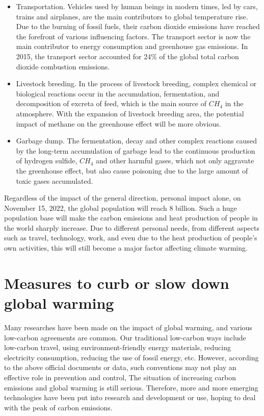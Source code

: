\documentclass{apmcmthesis}
\begin{document}
\begin{itemize}
  \item Transportation. Vehicles used by human beings in modern times, led by cars, trains and airplanes, are the main contributors to global temperature rise. Due to the burning of fossil fuels, their carbon dioxide emissions have reached the forefront of various influencing factors. The transport sector is now the main contributor to energy consumption and greenhouse gas emissions. In 2015, the transport sector accounted for 24$\%$ of the global total carbon dioxide combustion emissions.
  \item Livestock breeding. In the process of livestock breeding, complex chemical or biological reactions occur in the accumulation, fermentation, and decomposition of excreta of feed, which is the main source of $CH_4$ in the atmosphere.  With the expansion of livestock breeding area, the potential impact of methane on the greenhouse effect will be more obvious.
  \item Garbage dump. The fermentation, decay and other complex reactions caused by the long-term accumulation of garbage lead to the continuous production of hydrogen sulfide, $CH_4$ and other harmful gases, which not only aggravate the greenhouse effect, but also cause poisoning due to the large amount of toxic gases accumulated.
\end{itemize}

Regardless of the impact of the general direction, personal impact alone, on November 15, 2022, the global population will reach 8 billion. Such a huge population base will make the carbon emissions and heat production of people in the world sharply increase. Due to different personal needs, from different aspects such as travel, technology, work, and even due to the heat production of people's own activities, this will still become a major factor affecting climate warming.

\section{Measures to curb or slow down global warming}
Many researches have been made on the impact of global warming, and various low-carbon agreements are common. Our traditional low-carbon ways include low-carbon travel, using environment-friendly energy materials, reducing electricity consumption, reducing the use of fossil energy, etc. However, according to the above official documents or data, such conventions may not play an effective role in prevention and control, The situation of increasing carbon emissions and global warming is still serious. Therefore, more and more emerging technologies have been put into research and development or use, hoping to deal with the peak of carbon emissions.
\end{document}

